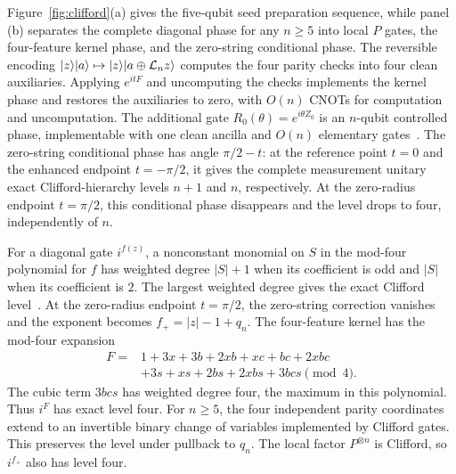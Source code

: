 
Figure~\ref{fig:clifford}(a) gives the five-qubit seed preparation sequence, while panel (b) separates the complete diagonal phase for any $n\ge5$ into local $P$ gates, the four-feature kernel phase, and the zero-string conditional phase. The reversible encoding $\lvert z\rangle\lvert a\rangle\mapsto\lvert z\rangle\lvert a\oplus\mathcal L_nz\rangle$ computes the four parity checks into four clean auxiliaries. Applying $e^{itF}$ and uncomputing the checks implements the kernel phase and restores the auxiliaries to zero, with $O(n)$ CNOTs for computation and uncomputation. The additional gate $R_0(\theta)=e^{i\theta Z_0}$ is an $n$-qubit controlled phase, implementable with one clean ancilla and $O(n)$ elementary gates~\cite{Barenco1995}. The zero-string conditional phase has angle $\pi/2-t$: at the reference point $t=0$ and the enhanced endpoint $t=-\pi/2$, it gives the complete measurement unitary exact Clifford-hierarchy levels $n+1$ and $n$, respectively. At the zero-radius endpoint $t=\pi/2$, this conditional phase disappears and the level drops to four, independently of $n$.

For a diagonal gate $i^{f(z)}$, a nonconstant monomial on $S$ in the mod-four polynomial for $f$ has weighted degree $|S|+1$ when its coefficient is odd and $|S|$ when its coefficient is $2$. The largest weighted degree gives the exact Clifford level~\cite{GottesmanChuang1999,Cui2017}. At the zero-radius endpoint $t=\pi/2$, the zero-string correction vanishes and the exponent becomes $f_+=|z|-1+q_n$. The four-feature kernel has the mod-four expansion
\begin{equation}
 \begin{aligned}
 F={}&1+3x+3b+2xb+xc+bc+2xbc\\
 &+3s+xs+2bs+2xbs+3bcs\pmod4.
 \end{aligned}
 \label{physics:kernel-mod-four}
\end{equation}
The cubic term $3bcs$ has weighted degree four, the maximum in this polynomial. Thus $i^F$ has exact level four. For $n\ge5$, the four independent parity coordinates extend to an invertible binary change of variables implemented by Clifford gates. This preserves the level under pullback to $q_n$. The local factor $P^{\otimes n}$ is Clifford, so $i^{f_+}$ also has level four.

